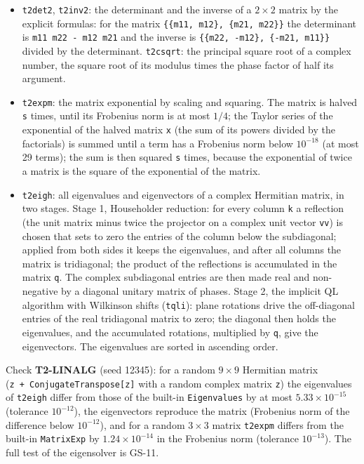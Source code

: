 \documentclass[
  10pt,
]{article}
\providecommand{\tightlist}{%
  \setlength{\itemsep}{0pt}\setlength{\parskip}{0pt}}
\begin{document}
\begin{itemize}
\tightlist
\item
  \texttt{t2det2}, \texttt{t2inv2}: the determinant and the inverse of a
  \(2\times2\) matrix by the explicit formulas: for the matrix
  \texttt{\{\{m11,\ m12\},\ \{m21,\ m22\}\}} the determinant is
  \texttt{m11\ m22\ -\ m12\ m21} and the inverse is
  \texttt{\{\{m22,\ -m12\},\ \{-m21,\ m11\}\}} divided by the
  determinant. \texttt{t2csqrt}: the principal square root of a complex
  number, the square root of its modulus times the phase factor of half
  its argument.
\item
  \texttt{t2expm}: the matrix exponential by scaling and squaring. The
  matrix is halved \texttt{s} times, until its Frobenius norm is at most
  \(1/4\); the Taylor series of the exponential of the halved matrix
  \texttt{x} (the sum of its powers divided by the factorials) is summed
  until a term has a Frobenius norm below \(10^{-18}\) (at most 29
  terms); the sum is then squared \texttt{s} times, because the
  exponential of twice a matrix is the square of the exponential of the
  matrix.
\item
  \texttt{t2eigh}: all eigenvalues and eigenvectors of a complex
  Hermitian matrix, in two stages. Stage 1, Householder reduction: for
  every column \texttt{k} a reflection (the unit matrix minus twice the
  projector on a complex unit vector \texttt{vv}) is chosen that sets to
  zero the entries of the column below the subdiagonal; applied from
  both sides it keeps the eigenvalues, and after all columns the matrix
  is tridiagonal; the product of the reflections is accumulated in the
  matrix \texttt{q}. The complex subdiagonal entries are then made real
  and non-negative by a diagonal unitary matrix of phases. Stage 2, the
  implicit QL algorithm with Wilkinson shifts (\texttt{tqli}): plane
  rotations drive the off-diagonal entries of the real tridiagonal
  matrix to zero; the diagonal then holds the eigenvalues, and the
  accumulated rotations, multiplied by \texttt{q}, give the
  eigenvectors. The eigenvalues are sorted in ascending order.
\end{itemize}

Check \textbf{T2-LINALG} (seed 12345): for a random \(9\times9\)
Hermitian matrix (\texttt{z\ +\ ConjugateTranspose{[}z{]}} with a random
complex matrix \texttt{z}) the eigenvalues of \texttt{t2eigh} differ
from those of the built-in \texttt{Eigenvalues} by at most
\(5.33\times10^{-15}\) (tolerance \(10^{-12}\)), the eigenvectors
reproduce the matrix (Frobenius norm of the difference below
\(10^{-12}\)), and for a random \(3\times3\) matrix \texttt{t2expm}
differs from the built-in \texttt{MatrixExp} by \(1.24\times10^{-14}\)
in the Frobenius norm (tolerance \(10^{-13}\)). The full test of the
eigensolver is GS-11.
\end{document}
